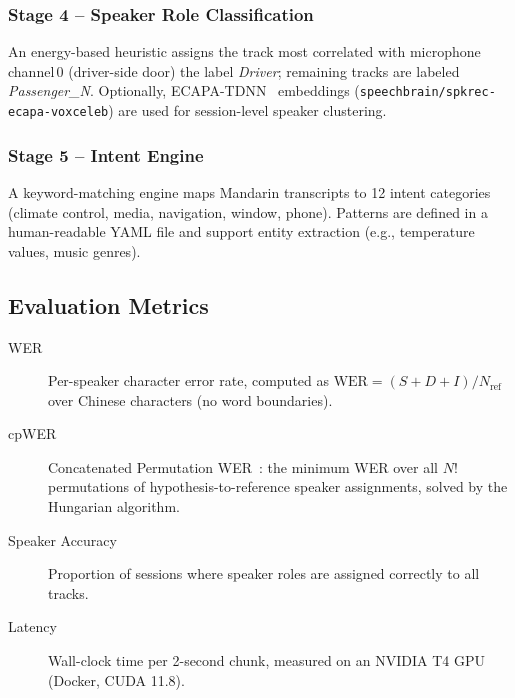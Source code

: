 \subsubsection{Stage 4 – Speaker Role Classification}
An energy-based heuristic assigns the track most correlated with microphone
channel\,0 (driver-side door) the label \textit{Driver}; remaining tracks
are labeled \textit{Passenger\_N}. Optionally, ECAPA-TDNN~\cite{desplanques2020ecapa}
embeddings (\texttt{speechbrain/spkrec-ecapa-voxceleb}) are used for
session-level speaker clustering.

\subsubsection{Stage 5 – Intent Engine}
A keyword-matching engine maps Mandarin transcripts to 12 intent categories
(climate control, media, navigation, window, phone). Patterns are defined in
a human-readable YAML file and support entity extraction (e.g., temperature
values, music genres).

\subsection{Evaluation Metrics}
\label{subsec:metrics}

\begin{description}
    \item[WER] Per-speaker character error rate, computed as
    $\text{WER} = (S + D + I) / N_{\text{ref}}$ over Chinese characters
    (no word boundaries).
    \item[cpWER] Concatenated Permutation WER~\cite{watanabe2020chime6}:
    the minimum WER over all $N!$ permutations of hypothesis-to-reference
    speaker assignments, solved by the Hungarian algorithm.
    \item[Speaker Accuracy] Proportion of sessions where speaker roles
    are assigned correctly to all tracks.
    \item[Latency] Wall-clock time per 2-second chunk, measured on an
    NVIDIA T4 GPU (Docker, CUDA 11.8).
\end{description}
